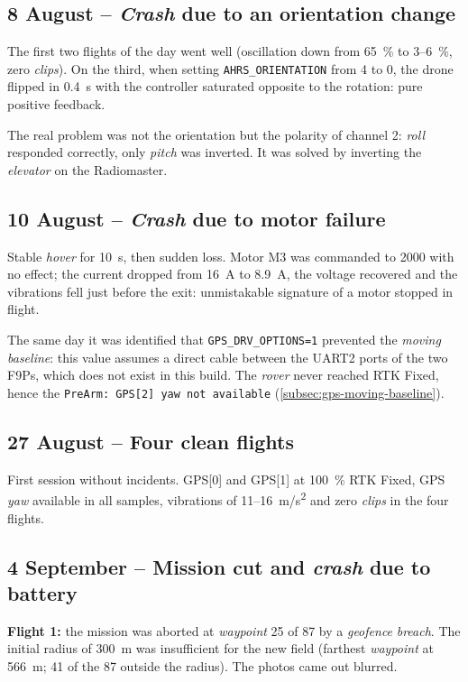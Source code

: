 \subsection{8 August -- \emph{Crash} due to an orientation change}

The first two flights of the day went well (oscillation down from 65~\% to 3--6~\%, zero \emph{clips}). On the third, when setting \texttt{AHRS\_ORIENTATION} from 4 to 0, the drone flipped in 0.4~s with the controller saturated opposite to the rotation: pure positive feedback.

The real problem was not the orientation but the polarity of channel 2: \emph{roll} responded correctly, only \emph{pitch} was inverted. It was solved by inverting the \emph{elevator} on the Radiomaster.

\subsection{10 August -- \emph{Crash} due to motor failure}

Stable \emph{hover} for 10~s, then sudden loss. Motor M3 was commanded to 2000 with no effect; the current dropped from 16~A to 8.9~A, the voltage recovered and the vibrations fell just before the exit: unmistakable signature of a motor stopped in flight.

The same day it was identified that \texttt{GPS\_DRV\_OPTIONS=1} prevented the \emph{moving baseline}: this value assumes a direct cable between the UART2 ports of the two F9Ps, which does not exist in this build. The \emph{rover} never reached RTK Fixed, hence the \texttt{PreArm: GPS[2] yaw not available} (\cref{subsec:gps-moving-baseline}).

\subsection{27 August -- Four clean flights}

First session without incidents. GPS[0] and GPS[1] at 100~\% RTK Fixed, GPS \emph{yaw} available in all samples, vibrations of 11--16~m/s\textsuperscript{2} and zero \emph{clips} in the four flights.

\subsection{4 September -- Mission cut and \emph{crash} due to battery}

\textbf{Flight 1:} the mission was aborted at \emph{waypoint} 25 of 87 by a \emph{geofence} \emph{breach}. The initial radius of 300~m was insufficient for the new field (farthest \emph{waypoint} at 566~m; 41 of the 87 outside the radius). The photos came out blurred.

